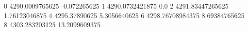 0 4290.0009765625 -0.072265625
1 4290.0732421875 0.0
2 4291.83447265625 1.76123046875
4 4295.37890625 5.3056640625
6 4298.76708984375 8.69384765625
8 4303.283203125 13.2099609375
